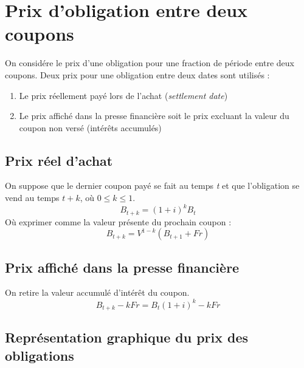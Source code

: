 \documentclass[11pt,french]{report}
\begin{document}
\section{Prix d'obligation entre deux coupons}
\label{sec:price between}

On considére le prix d'une obligation pour une fraction de période entre deux coupons.  Deux prix pour une obligation entre deux dates sont utilisés :
\begin{enumerate}
\item Le prix réellement payé lors de l'achat (\emph{settlement date})
\item Le prix affiché dans la presse financière soit le prix excluant la valeur du coupon non versé (intérêts accumulés)
\end{enumerate}

\subsection{Prix réel d'achat}
\label{sub:sec:prix réel}

On suppose que le dernier coupon payé se fait au temps \textit{t} et que l'obligation se vend au temps $ t + k $, où $ 0 \leq k \leq 1 $.
\begin{equation}
B_{t+k} = (1+i)^{k}B_{t}
\end{equation}
Où exprimer comme la valeur présente du prochain coupon :
\begin{equation}
B_{t+k} = V^{1-k}(B_{t+1} + Fr)
\end{equation}

\subsection{Prix affiché dans la presse financière}
\label{sub:sec:presse financiere}

On retire la valeur accumulé d'intérêt du coupon.
\begin{equation}
B_{t+k} - kFr = B_{t}(1+i)^{k} - kFr
\end{equation}

\subsection{Représentation graphique du prix des obligations}
\label{sub:sec:graphique obligations}
\end{document}
